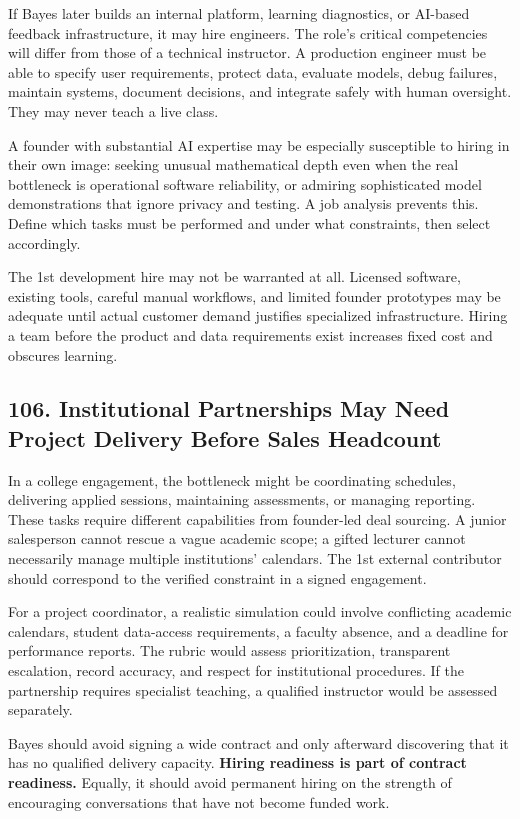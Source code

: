 If Bayes later builds an internal platform, learning diagnostics, or AI-based feedback infrastructure, it may hire engineers. The role's critical competencies will differ from those of a technical instructor. A production engineer must be able to specify user requirements, protect data, evaluate models, debug failures, maintain systems, document decisions, and integrate safely with human oversight. They may never teach a live class.

A founder with substantial AI expertise may be especially susceptible to hiring in their own image: seeking unusual mathematical depth even when the real bottleneck is operational software reliability, or admiring sophisticated model demonstrations that ignore privacy and testing. A job analysis prevents this. Define which tasks must be performed and under what constraints, then select accordingly.

The 1st development hire may not be warranted at all. Licensed software, existing tools, careful manual workflows, and limited founder prototypes may be adequate until actual customer demand justifies specialized infrastructure. Hiring a team before the product and data requirements exist increases fixed cost and obscures learning.

\subsection*{106. Institutional Partnerships May Need Project Delivery Before Sales Headcount}

In a college engagement, the bottleneck might be coordinating schedules, delivering applied sessions, maintaining assessments, or managing reporting. These tasks require different capabilities from founder-led deal sourcing. A junior salesperson cannot rescue a vague academic scope; a gifted lecturer cannot necessarily manage multiple institutions' calendars. The 1st external contributor should correspond to the verified constraint in a signed engagement.

For a project coordinator, a realistic simulation could involve conflicting academic calendars, student data-access requirements, a faculty absence, and a deadline for performance reports. The rubric would assess prioritization, transparent escalation, record accuracy, and respect for institutional procedures. If the partnership requires specialist teaching, a qualified instructor would be assessed separately.

Bayes should avoid signing a wide contract and only afterward discovering that it has no qualified delivery capacity. \textbf{Hiring readiness is part of contract readiness.} Equally, it should avoid permanent hiring on the strength of encouraging conversations that have not become funded work.

